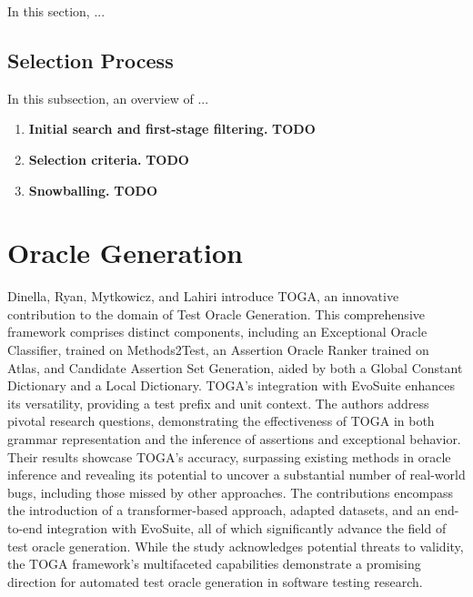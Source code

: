 In this section, ...

\vspace{0.1 cm}
\subsection{Selection Process}
\label{sec:selection_process}
\vspace{0.1 cm}

In this subsection, an overview of ...

\begin{enumerate}[label=\textbf{\arabic*.}]
  \item\textbf{Initial search and first-stage filtering.} \textbf{TODO}
  \item\textbf{Selection criteria.} \textbf{TODO}
  \item\textbf{Snowballing.} \textbf{TODO}
\end{enumerate}

\section{Oracle Generation}
\label{sec:soa_oracle_generation}
\vspace{0.2 cm}

Dinella, Ryan, Mytkowicz, and Lahiri introduce TOGA\cite{gabriel_ryan_toga_2022}, an innovative contribution to the domain of Test Oracle Generation. This comprehensive framework comprises distinct components, including an Exceptional Oracle Classifier, trained on Methods2Test, an Assertion Oracle Ranker trained on Atlas, and Candidate Assertion Set Generation, aided by both a Global Constant Dictionary and a Local Dictionary. TOGA's integration with EvoSuite enhances its versatility, providing a test prefix and unit context. The authors address pivotal research questions, demonstrating the effectiveness of TOGA in both grammar representation and the inference of assertions and exceptional behavior. Their results showcase TOGA's accuracy, surpassing existing methods in oracle inference and revealing its potential to uncover a substantial number of real-world bugs, including those missed by other approaches. The contributions encompass the introduction of a transformer-based approach, adapted datasets, and an end-to-end integration with EvoSuite, all of which significantly advance the field of test oracle generation. While the study acknowledges potential threats to validity, the TOGA framework's multifaceted capabilities demonstrate a promising direction for automated test oracle generation in software testing research.

